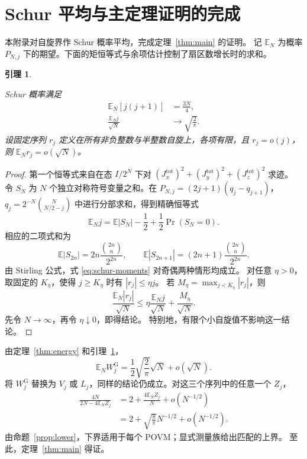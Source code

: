 \documentclass[aps,pra,reprint,superscriptaddress,longbibliography]{revtex4-2}
\newtheorem{lemma}[theorem]{引理}
\theoremstyle{remark}
\newcommand{\E}{\mathbb E}
\newcommand{\g}{\mathrm G}
\begin{document}
\section{Schur 平均与主定理证明的完成}\label{sec:averaging}

本附录对自旋界作 Schur 概率平均，完成定理~\ref{thm:main} 的证明。
记 $\E_N$ 为概率 $P_{N,j}$ 下的期望。下面的矩恒等式与余项估计控制了扇区数增长时的求和。

\begin{lemma}\label{lem:averaging}

Schur 概率满足
\begin{equation}
\begin{aligned}
\E_N[j(j+1)]&=\frac{3N}{4},\\
\frac{\E_Nj}{\sqrt N}&\longrightarrow\sqrt{\frac2\pi}.
\end{aligned}
\label{eq:schur-moments}
\end{equation}
设固定序列 $r_j$ 定义在所有非负整数与半整数自旋上，各项有限，且 $r_j=o(j)$，
则 $\E_Nr_j=o(\sqrt N)$。

\end{lemma}

\begin{proof}

第一个恒等式来自在态 $I/2^N$ 下对
$(J_x^{\mathrm{tot}})^2+(J_y^{\mathrm{tot}})^2+(J_z^{\mathrm{tot}})^2$ 求迹。
令 $S_N$ 为 $N$ 个独立对称符号变量之和。在
$P_{N,j}=(2j+1)(q_j-q_{j+1})$，
$q_j=2^{-N}\binom N{N/2-j}$ 中进行分部求和，得到精确恒等式
\begin{equation}
 \E_Nj=\E|S_N|-\frac12+\frac12\Pr(S_N=0).
 \label{eq:walk}
\end{equation}
相应的二项式和为
\[
 \E|S_{2n}|=2n\frac{\binom{2n}n}{2^{2n}},\qquad
 \E|S_{2n+1}|=(2n+1)\frac{\binom{2n}n}{2^{2n}}.
\]
由 Stirling 公式，式 \eqref{eq:schur-moments} 对奇偶两种情形均成立。
对任意 $\eta>0$，取固定的 $K_\eta$，使得 $j\geq K_\eta$ 时有 $|r_j|\leq\eta j$。
若 $M_\eta=\max_{j<K_\eta}|r_j|$，则
\[
 \frac{\E_N|r_j|}{\sqrt N}
 \leq\eta\frac{\E_Nj}{\sqrt N}+\frac{M_\eta}{\sqrt N}.
\]
先令 $N\to\infty$，再令 $\eta\downarrow0$，即得结论。
特别地，有限个小自旋值不影响这一结论。

\end{proof}

由定理~\ref{thm:energy} 和引理~\ref{lem:averaging}，
\begin{equation}
 \E_N W_j^{\g}=\frac12\sqrt{\frac2\pi}\sqrt N+o(\sqrt N).
 \label{eq:averaged-W}
\end{equation}
将 $W_j^{\g}$ 替换为 $V_j$ 或 $L_j$，同样的结论仍成立。对这三个序列中的任意一个 $Z_j$，
\begin{equation}
\begin{aligned}
\frac{4N}{2N-4\E_NZ_j}
 &=2+\frac{4\E_NZ_j}{N}+o(N^{-1/2})\\
 &=2+\sqrt{\frac8\pi}N^{-1/2}+o(N^{-1/2}).
\end{aligned}
\label{eq:risk-expansion}
\end{equation}
由命题~\ref{prop:lower}，下界适用于每个 POVM；显式测量族给出匹配的上界。
至此，定理~\ref{thm:main} 得证。
\end{document}
